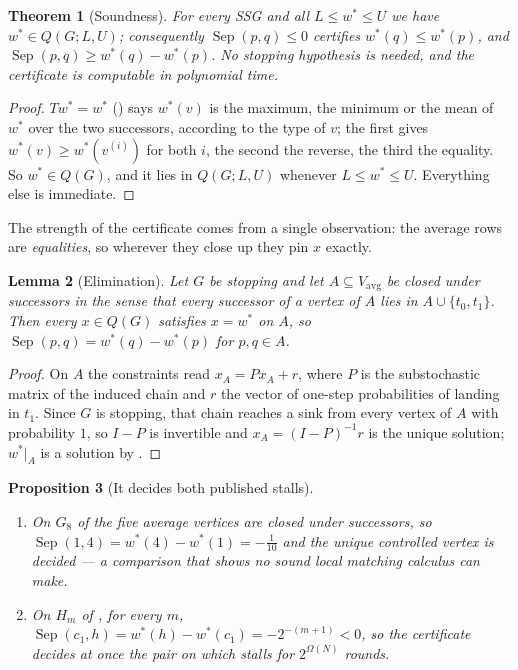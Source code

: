 \documentclass[11pt]{article}
\theoremstyle{plain}
\newtheorem{theorem}{Theorem}[section]
\newtheorem{lemma}[theorem]{Lemma}
\newtheorem{proposition}[theorem]{Proposition}
\theoremstyle{definition}
\newcommand{\Vavg}{V_{\mathrm{avg}}}
\begin{document}
\begin{theorem}[Soundness]\label{thm:transport-sound}
For every SSG and all $L\le w^\ast\le U$ we have $w^\ast\in Q(G;L,U)$;
consequently $\operatorname{Sep}(p,q)\le0$ certifies
$w^\ast(q)\le w^\ast(p)$, and $\operatorname{Sep}(p,q)\ge w^\ast(q)-w^\ast(p)$.
No stopping hypothesis is needed, and the certificate is computable in
polynomial time.
\end{theorem}

\begin{proof}
$Tw^\ast=w^\ast$ () says $w^\ast(v)$ is the
maximum, the minimum or the mean of $w^\ast$ over the two successors,
according to the type of $v$; the first gives
$w^\ast(v)\ge w^\ast(v^{(i)})$ for both $i$, the second the reverse, the
third the equality. So $w^\ast\in Q(G)$, and it lies in $Q(G;L,U)$
whenever $L\le w^\ast\le U$. Everything else is immediate.
\end{proof}

The strength of the certificate comes from a single observation: the
average rows are \emph{equalities}, so wherever they close up they pin
$x$ exactly.

\begin{lemma}[Elimination]\label{lem:transport-exact}
Let $G$ be stopping and let $A\subseteq\Vavg$ be closed under successors
in the sense that every successor of a vertex of $A$ lies in
$A\cup\{t_0,t_1\}$. Then every $x\in Q(G)$ satisfies $x=w^\ast$ on $A$,
so $\operatorname{Sep}(p,q)=w^\ast(q)-w^\ast(p)$ for $p,q\in A$.
\end{lemma}

\begin{proof}
On $A$ the constraints read $x_A=Px_A+r$, where $P$ is the substochastic
matrix of the induced chain and $r$ the vector of one-step probabilities
of landing in $t_1$. Since $G$ is stopping, that chain reaches a sink
from every vertex of $A$ with probability $1$, so $I-P$ is invertible and
$x_A=(I-P)^{-1}r$ is the unique solution; $w^\ast|_A$ is a solution by
.
\end{proof}

\begin{proposition}[It decides both published stalls]\label{prop:transport-decides}
\begin{enumerate}[label=(\alph*),leftmargin=2.2em]
\item On $G_8$ of  the five average vertices
      are closed under successors, so
      $\operatorname{Sep}(1,4)=w^\ast(4)-w^\ast(1)=-\tfrac1{10}$ and the
      unique controlled vertex is decided --- a comparison that
       shows no sound local matching calculus
      can make.
\item On $H_m$ of , for every $m$,
      $\operatorname{Sep}(c_1,h)=w^\ast(h)-w^\ast(c_1)=-2^{-(m+1)}<0$,
      so the certificate decides at once the pair on which
       stalls for $2^{\Omega(N)}$ rounds.
\end{enumerate}
\end{proposition}
\end{document}
